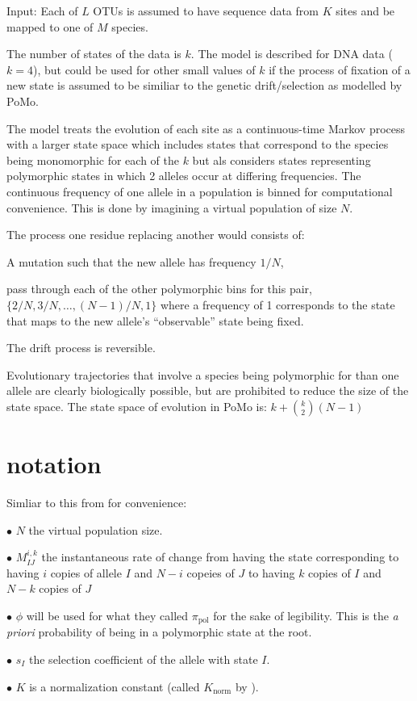 \documentclass{llncs}
\newcommand{\numOTUs}{\ensuremath{L}}
\newcommand{\numSites}{\ensuremath{K}}
\newcommand{\numSp}{\ensuremath{M}}
\newcommand{\numObsStates}{\ensuremath{k}}
\newcommand{\virtPopSize}{\ensuremath{N}}
\newcommand{\polyProb}{\ensuremath{\phi}}}
\newcommand{\Knorm}{\ensuremath{K}}}
\newcommand{\pomo}{PoMo\xspace}
\begin{document}
Input: Each of $\numOTUs$ OTUs is assumed to have sequence data from $\numSites$ sites and be mapped to one of $\numSp$ species.

The number of states of the data is $\numObsStates$. 
The model is described for DNA data ($\numObsStates=4$), but could be used for other small values of $\numObsStates$ if
    the process of fixation of a new state is assumed to be similiar to the genetic drift/selection as modelled by \pomo.

The model treats the evolution of each site as a continuous-time Markov process with a larger state space which
    includes states that correspond to the species being monomorphic for each of the $\numObsStates$ but als
    considers states representing polymorphic states in which 2 alleles occur at differing frequencies.
The continuous frequency of one allele in a population is binned for computational convenience.
This is done by imagining a virtual population of size $\virtPopSize$.

The process one residue replacing another would consists of:
\begin{compactenum}
\item A mutation such that the new allele has frequency $1/\virtPopSize$,
\item pass through each of the other polymorphic bins for this pair, $\{2/\virtPopSize, 3/\virtPopSize,\ldots,(\virtPopSize-1)/\virtPopSize, 1\}$
    where a frequency of 1 corresponds to the state that maps to the new allele's ``observable'' state being fixed.
\end{compactenum}
The drift process is reversible.

Evolutionary trajectories that involve a species being polymorphic for than one allele are clearly 
    biologically possible, but are prohibited to reduce the size of the state space.
    The state space of evolution in \pomo is: $\numObsStates + {\numObsStates \choose 2} \left(\virtPopSize - 1\right)$

\section{notation}
Simliar to this from  \cite{DeMaioSK2013} for convenience:
\begin{compactitem}
\item[$\bullet$] $\virtPopSize$ the virtual population size.
\item[$\bullet$] $M_{IJ}^{i,k}$ the instantaneous rate of change from having the state corresponding to having $i$ copies of allele $I$ and $N-i$ copeies of $J$ to having $k$ copies of $I$ and $N-k$ copies of $J$
\item[$\bullet$] $\polyProb$ will be used for what they called $\pi_{\mbox{pol}}$ for the sake of 
    legibility. This is the {\em a priori} probability of being in a polymorphic state at the root.
\item[$\bullet$] $s_I$ the selection coefficient of the allele with state $I$.
\item[$\bullet$] $\Knorm$ is a normalization constant (called $K_{\mbox{norm}}$ by \cite{DeMaioSK2013}).
\end{compactitem}
\end{document}
